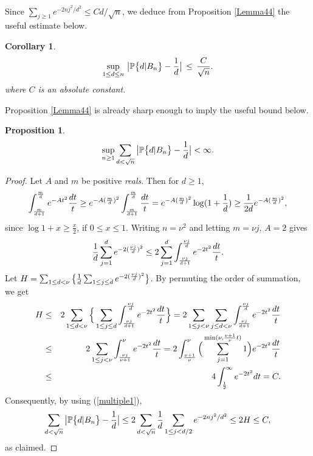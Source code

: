 \documentclass[11pt,draft,reqno]{amsart}
\newtheorem{proposition}[theorem]{Proposition}
\newtheorem{corollary}[theorem]{Corollary}
\theoremstyle{definition}
\theoremstyle{remarks}
\numberwithin{equation}{section}
\def\P{{\mathcal P}}
\def\P{{\mathbb P}}
\begin{document}
Since $\sum_{j\ge 1} e^{- { 2n j^2/  d^2}}\le
Cd/\sqrt n $,   we  deduce  from Proposition \ref{Lemma44} the useful estimate below.
\begin{corollary}\label{c.useful.est}
\begin{equation*}   \sup_{1\le d\le n}\,\big|\P\big\{d|B_n\big\}- {1\over d}  \big| \, \le \,   {C \over\sqrt n} .
\end{equation*}
where $C$ is an absolute constant. 
\end{corollary}

  \bigskip \par Proposition \ref{Lemma44}  is   already sharp enough  to
imply  the   useful bound below.
 \begin{proposition} \label{unifd}  $$\sup_{n\ge 1} \sum_{d<\sqrt n} \big|\P\big\{  d|   B_{ n}
\big\}-{1\over d} 
\big|<\infty.$$
\end{proposition}\begin{proof}
  Let $A $ and   $m$ be positive {\it reals}. Then for $d\ge 1$,
$$ \int_{m\over d+1}^{m\over d}e^{-At^2}{  d t\over t}\ge e^{-A({m\over d})^2}\int_{m\over d+1}^{m\over d} {  d t\over t}=e^{-A({m\over
d})^2}\log (1+{ 1\over d})\ge  { 1\over 2d}e^{-A({m\over
d})^2} , $$
since $\log 1+x\ge \frac{x}{2}$, if $0\le x\le 1$. Writing  $n=\nu^2$ and letting $m=\nu j$, $A=2$  gives
$${1\over d}\sum_{j=1}^d e^{-2({\nu j\over
d})^2}\le 2 \sum_{j=1}^d  \int_{\nu j\over d+1}^{\nu j\over d}e^{-2t^2}{  d t\over t}.$$
Let 
 $ H= \sum_{1\le d<\nu} \big\{{1\over d}\sum_{1\le j\le d} e^{-2({\nu j\over
d})^2}\big\}$.  
By permuting the order of summation, we get
\begin{eqnarray*}H&\le& 2\sum_{1\le d<\nu}\Big\{\sum_{1\le j\le d}   \int_{\nu j\over d+1}^{\nu j\over d}e^{-2t^2}{  d t\over t}\Big\}
=2\sum_{1\le j<\nu}\sum_{j\le d<\nu} \int_{\nu j\over d+1}^{\nu j\over d}e^{-2t^2}{  d t\over t}
\cr &\le &2
\sum_{1\le j<\nu} \int_{  {\nu j\over \nu+1}  }^{\nu  }e^{-2t^2}{  d t\over t}=  2 \int_{  {\nu +1 \over \nu }}^{\nu  }\Big(\sum_{j=1}^{\min(\nu ,
{\nu +1 \over \nu }t)}1\Big)  e^{-2t^2}{  d t\over t}  
\cr &\le & 4\int_{{ 1 \over 2 } }^\infty  e^{-2t^2}  
d t  = C. \end{eqnarray*}
Consequently, by using (\ref{multiple1}),
 \begin{equation*}  
  \sum_{d<\sqrt n} \big|\P\big\{  d|   B_{ n}
\big\}-{1\over d} 
\big|\le 2\sum_{d<\sqrt n} {1\over d}\sum_{ 1\le j<d/2}
e^{-        {
 2n j^2/  d^2}  }\le 2H\le C, \end{equation*}
as claimed.\end{proof}
\end{document}
